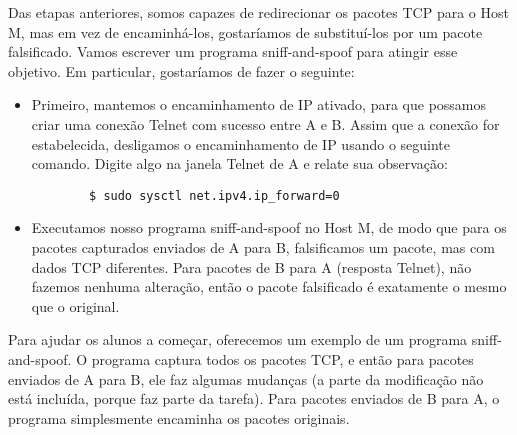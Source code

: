 	Das etapas anteriores, somos capazes de redirecionar os pacotes TCP para o Host M, mas em vez de
	encaminhá-los, gostaríamos de substituí-los por um pacote falsificado. Vamos escrever um
	programa sniff-and-spoof para atingir esse objetivo. Em particular, gostaríamos de fazer o
	seguinte:
	
	\begin{itemize}
		
		\item Primeiro, mantemos o encaminhamento de IP ativado, para que possamos criar uma conexão Telnet com sucesso
		entre A e B. Assim que a conexão for estabelecida, desligamos o encaminhamento de IP usando o
		seguinte comando. Digite algo na janela Telnet de A e relate sua observação: 
		
		\begin{lstlisting}
		$ sudo sysctl net.ipv4.ip_forward=0
		\end{lstlisting}
		
		\item Executamos nosso programa sniff-and-spoof no Host M, de modo que para os pacotes capturados enviados
		de A para B, falsificamos um pacote, mas com dados TCP diferentes. Para pacotes de B para A (resposta Telnet), 
		não fazemos nenhuma alteração, então o pacote falsificado é exatamente o mesmo que o original.
	\end{itemize} 
	
	Para ajudar os alunos a começar, oferecemos um exemplo de um programa sniff-and-spoof. 
	O programa captura todos os pacotes TCP, e
	então para pacotes enviados de A para B, ele faz algumas mudanças (a parte da modificação
	não está incluída, porque faz parte da tarefa). Para pacotes enviados de
	B para A, o programa simplesmente encaminha os pacotes originais.
	
